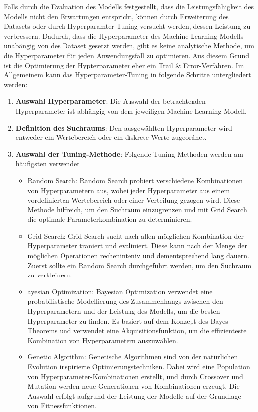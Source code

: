 \documentclass[conference]{IEEEtran}
\begin{document}
Falls durch die Evaluation des Modells festgestellt, dass die Leistungsfähigkeit des Modells nicht den Erwartungen entspricht, können durch Erweiterung des Datasets oder durch Hyperparamter-Tuning versucht werden, dessen Leistung zu verbressern.
Dadurch, dass die Hyperparameter des Machine Learning Modells unabängig von des Dataset gesetzt werden, gibt es keine analytische Methode, um die Hyperparameter für jeden Anwendungsfall zu optimieren. Aus diesem Grund ist die Optimierung der Hypterparameter eher ein Trail \& Error-Verfahren.
Im Allgemeinem kann das Hyperparameter-Tuning in folgende Schritte untergliedert werden:
\begin{enumerate}
    \item \textbf{Auswahl Hyperparameter}: Die Auswahl der betrachtenden Hyperparameter ist abhängig von dem jeweiligen Machine Learning Modell.
    \item \textbf{Definition des Suchraums}: Den ausgewählten Hyperparameter wird entweder ein Wertebereich oder ein diskrete Werte zugeordnet.
    \item \textbf{Auswahl der Tuning-Methode}: Folgende Tuning-Methoden werden am häufigsten verwendet
        \begin{itemize}
            \item Random Search: Random Search probiert verschiedene Kombinationen von Hyperparametern aus, wobei jeder Hyperparameter aus einem vordefinierten Wertebereich oder einer Verteilung gezogen wird. Diese Methode hilfreich, um den Suchraum einzugrenzen und mit Grid Search die optimale Parameterkombination zu determinieren.
            \item Grid Search: Grid Search sucht nach allen mölglichen Kombination der Hyperparameter traniert und evaliuiert. Diese kann nach der Menge der möglichen Operationen recheninteniv und dementsprechend lang dauern. Zuerst sollte ein Random Search durchgeführt werden, um den Suchraum zu verkleinern.
            \item ayesian Optimization: Bayesian Optimization verwendet eine probabilistische Modellierung des Zusammenhangs zwischen den Hyperparametern und der Leistung des Modells, um die besten Hyperparameter zu finden. Es basiert auf dem Konzept des Bayes-Theorems und verwendet eine Akquisitionsfunktion, um die effizienteste Kombination von Hyperparametern auszuwählen.
            \item Genetic Algorithm: Genetische Algorithmen sind von der natürlichen Evolution inspirierte Optimierungstechniken. Dabei wird eine Population von Hyperparameter-Kombinationen erstellt, und durch Crossover und Mutation werden neue Generationen von Kombinationen erzeugt. Die Auswahl erfolgt aufgrund der Leistung der Modelle auf der Grundlage von Fitnessfunktionen.

\end{itemize}
\end{enumerate}
\end{document}
